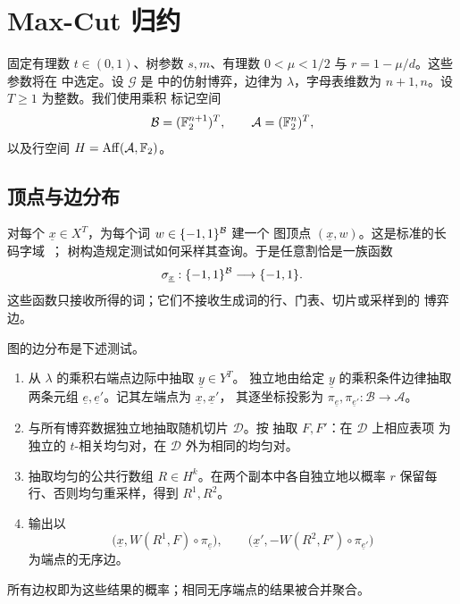 \section{Max-Cut 归约}\label{sec:reduction}

固定有理数 $t\in(0,1)$、树参数 $s,m$、有理数 $0<\mu<1/2$ 与
$r=1-\mu/d$。这些参数将在  中选定。设
$\mathcal G$ 是  中的仿射博弈，边律为
$\lambda$，字母表维数为 $n+1,n$。设 $T\ge1$ 为整数。我们使用乘积
标记空间
\[
 \mathcal B=(\mathbb F_2^{n+1})^T,\qquad
 \mathcal A=(\mathbb F_2^n)^T,
\]
以及行空间 $H=\operatorname{Aff}(\mathcal A,\mathbb F_2)$。

\subsection{顶点与边分布}

对每个 $\underline x\in X^T$，为每个词 $w\in\{-1,1\}^{\mathcal B}$ 建一个
图顶点 $(\underline x,w)$。这是标准的长码字域~\cite{BGS98,Hastad01}；
树构造规定测试如何采样其查询。于是任意割恰是一族函数
\[
 \sigma_{\underline x}:\{-1,1\}^{\mathcal B}\longrightarrow\{-1,1\}.
\]
这些函数只接收所得的词；它们不接收生成词的行、门表、切片或采样到的
博弈边。

图的边分布是下述测试。
\begin{enumerate}
\item 从 $\lambda$ 的乘积右端点边际中抽取 $\underline y\in Y^T$。
独立地由给定 $\underline y$ 的乘积条件边律抽取两条元组
$\underline e,\underline e'$。记其左端点为 $\underline x,\underline x'$，
其逐坐标投影为 $\pi_{\underline e},\pi_{\underline e'}:\mathcal B\to\mathcal A$。

\item 与所有博弈数据独立地抽取随机切片 $\mathcal D$。按
 抽取 $F,F'$：在 $\mathcal D$ 上相应表项
为独立的 $t$-相关均匀对，在 $\mathcal D$ 外为相同的均匀对。

\item 抽取均匀的公共行数组 $R\in H^k$。在两个副本中各自独立地以概率
$r$ 保留每行、否则均匀重采样，得到 $R^1,R^2$。

\item 输出以
\begin{equation}\label{eq:test-queries}
 \bigl(\underline x,W(R^1,F)\circ\pi_{\underline e}\bigr),
 \qquad
 \bigl(\underline x',-W(R^2,F')\circ\pi_{\underline e'}\bigr)
\end{equation}
为端点的无序边。
\end{enumerate}
所有边权即为这些结果的概率；相同无序端点的结果被合并聚合。

